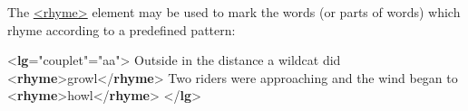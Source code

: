 The \hyperref[TEI.rhyme]{<rhyme>} element may be used to mark the words (or parts of words) which rhyme according to a predefined pattern: \par\bgroup{}\exampleFont \begin{shaded}\noindent\mbox{}{<\textbf{lg}\hspace*{1em}{type}="{couplet}"\hspace*{1em}{rhyme}="{aa}">}\mbox{}\newline 
{}Outside in the distance a wildcat did {<\textbf{rhyme}>}growl{</\textbf{rhyme}>}\mbox{}\newline 
{}\mbox{}\newline 
{}Two riders were approaching and the wind began to {<\textbf{rhyme}>}howl{</\textbf{rhyme}>}\mbox{}\newline 
{}\mbox{}\newline 
{</\textbf{lg}>}\end{shaded}\egroup\par \noindent \par
